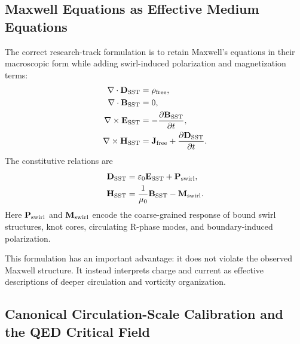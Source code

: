 \subsection{Maxwell Equations as Effective Medium Equations}
    
    The correct research-track formulation is to retain Maxwell's equations
    in their macroscopic form while adding swirl-induced polarization and
    magnetization terms:
    \begin{align}
        \nabla\cdot\mathbf{D}_{\rm SST}
        &=
        \rho_{\rm free},
        \label{eq:SST_gauss_D}
        \\
        \nabla\cdot\mathbf{B}_{\rm SST}
        &=
        0,
        \label{eq:SST_gauss_B}
        \\
        \nabla\times\mathbf{E}_{\rm SST}
        &=
        -
        \frac{\partial\mathbf{B}_{\rm SST}}{\partial t},
        \label{eq:SST_faraday}
        \\
        \nabla\times\mathbf{H}_{\rm SST}
        &=
        \mathbf{J}_{\rm free}
        +
        \frac{\partial\mathbf{D}_{\rm SST}}{\partial t}.
        \label{eq:SST_ampere}
    \end{align}
    The constitutive relations are
    \begin{align}
        \mathbf{D}_{\rm SST}
        &=
        \varepsilon_0\mathbf{E}_{\rm SST}
        +
        \mathbf{P}_{\rm swirl},
        \label{eq:D_constitutive_swirl}
        \\
        \mathbf{H}_{\rm SST}
        &=
        \frac{1}{\mu_0}\mathbf{B}_{\rm SST}
        -
        \mathbf{M}_{\rm swirl}.
        \label{eq:H_constitutive_swirl}
    \end{align}
    Here \(\mathbf{P}_{\rm swirl}\) and \(\mathbf{M}_{\rm swirl}\) encode the
    coarse-grained response of bound swirl structures, knot cores, circulating
    R-phase modes, and boundary-induced polarization.
    
    This formulation has an important advantage: it does not violate the
    observed Maxwell structure.  It instead interprets charge and current as
    effective descriptions of deeper circulation and vorticity organization.

\subsection{Canonical Circulation-Scale Calibration and the QED Critical Field}
    
